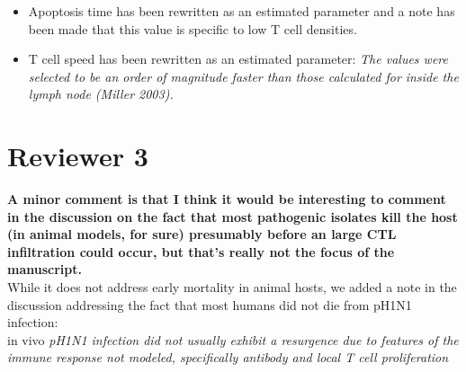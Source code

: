 \documentclass[10pt]{article}
\begin{document}
\begin{enumerate}
\begin{itemize}

\item Apoptosis time has been rewritten as an estimated parameter and a note has been made that this value is specific to low T cell densities.

\item T cell speed has been rewritten as an estimated parameter: \textit{The values were selected to be an order of magnitude faster than those calculated for inside the lymph node (Miller 2003).} \\

\end{itemize}

\end{enumerate}


\section*{Reviewer 3}

\textbf{A minor comment is that I think it would be interesting to comment in the discussion on the fact that most pathogenic isolates kill the host (in animal models, for sure) presumably before an large CTL infiltration could occur, but that's really not the focus of the manuscript.} \\

While it does not address early mortality in animal hosts, we added a note in the discussion addressing the fact that most humans did not die from pH1N1 infection: \\

in vivo \textit{pH1N1 infection did not usually exhibit a resurgence due to features of the immune response not modeled, specifically antibody and local T cell proliferation}
\end{document}
